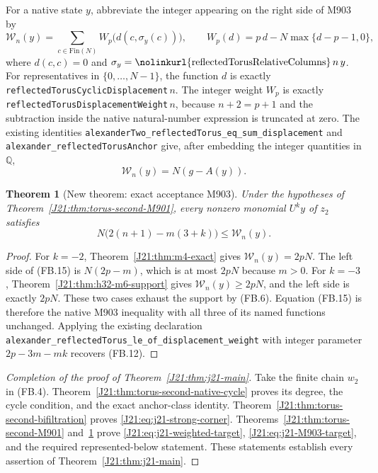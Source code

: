 \documentclass[11pt,oneside]{report}
\newtheorem{theorem}{Theorem}[section]
\theoremstyle{definition}
\numberwithin{equation}{section}
\newcommand{\decl}[1]{\textnormal{\nolinkurl{#1}}}
\begin{document}
For a native state $y$, abbreviate the integer appearing on the
right side of M903 by
\[
 \mathcal W_n(y)=\sum_{c\in\mathrm{Fin}(N)}
       W_p\bigl(d(c,\sigma_y(c))\bigr),\qquad
 W_p(d)=p\,d-N\max\{d-p-1,0\},
 \tag{FB.13}
\]
where $d(c,c)=0$ and
$\sigma_y=\decl{reflectedTorusRelativeColumns}\,n\,y$.
For representatives in $\{0,\ldots,N-1\}$, the function $d$ is
exactly \decl{reflectedTorusCyclicDisplacement}\,$n$.
The integer weight $W_p$ is exactly
\decl{reflectedTorusDisplacementWeight}\,$n$, because $n+2=p+1$
and the subtraction inside the native natural-number expression
is truncated at zero.
The existing identities
\decl{alexanderTwo_reflectedTorus_eq_sum_displacement} and
\decl{alexander_reflectedTorusAnchor} give, after embedding the
integer quantities in $\mathbb Q$,
\[
                            \mathcal W_n(y)=N(g-A(y)).
 \tag{FB.14}
\]

\begin{theorem}[New theorem: exact acceptance M903]
\label{J21:thm:torus-second-M903}
Under the hypotheses of Theorem~\ref{J21:thm:torus-second-M901}, every
nonzero monomial $U^k y$ of $z_2$ satisfies
\[
                  N\bigl(2(n+1)-m(3+k)\bigr)
                                      \leq \mathcal W_n(y).
 \tag{FB.15}
\]
\end{theorem}
\begin{proof}
For $k=-2$, Theorem~\ref{J21:thm:m4-exact} gives
$\mathcal W_n(y)=2pN$.
The left side of (FB.15) is $N(2p-m)$, which is at most $2pN$
because $m>0$.
For $k=-3$, Theorem~\ref{J21:thm:h32-m6-support} gives
$\mathcal W_n(y)\geq2pN$, and the left side is exactly $2pN$.
These two cases exhaust the support by (FB.6).
Equation (FB.15) is therefore the native M903 inequality with all
three of its named functions unchanged.
Applying the existing declaration
\decl{alexander_reflectedTorus_le_of_displacement_weight} with
integer parameter $2p-3m-mk$ recovers (FB.12).
\end{proof}

\begin{proof}[Completion of the proof of Theorem~\ref{J21:thm:j21-main}]
Take the finite chain $w_2$ in (FB.4). Theorem~\ref{J21:thm:torus-second-native-cycle}
proves its degree, the cycle condition, and the exact anchor-class identity.
Theorem~\ref{J21:thm:torus-second-bifiltration} proves
\eqref{J21:eq:j21-strong-corner}. Theorems~\ref{J21:thm:torus-second-M901}
and~\ref{J21:thm:torus-second-M903} prove \eqref{J21:eq:j21-weighted-target},
\eqref{J21:eq:j21-M903-target}, and the required represented-below statement.
These statements establish every assertion of Theorem~\ref{J21:thm:j21-main}.
\end{proof}
\end{document}
